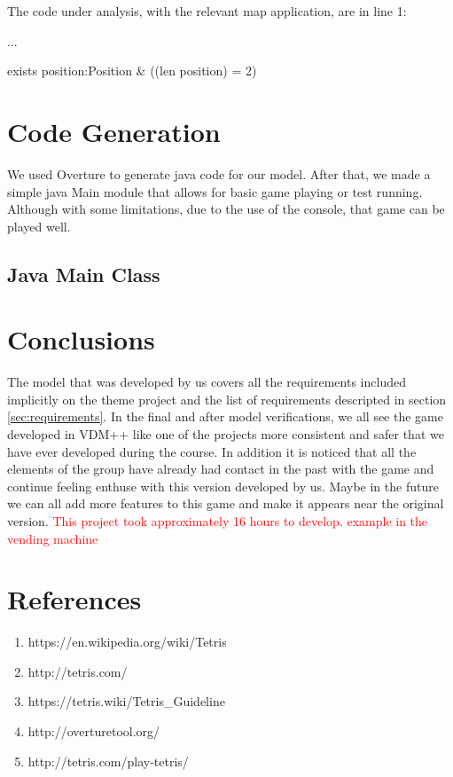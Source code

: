 \documentclass[a4paper]{article}
\begin{document}
The code under analysis, with the relevant map application, are in line 1:



...

\begin{center}
	exists position:Position \& ((len position) = 2)
\end{center}

\section{Code Generation}

We used Overture to generate java code for our model. After that, we made a simple java Main module that allows for basic game playing or test running. Although with some limitations, due to the use of the console, that game can be played well.

\subsection{Java Main Class}


\section{Conclusions} 

The model that was developed by us covers all the requirements included implicitly on the theme project and the list of requirements descripted in section \ref{sec:requirements}.
In the final and after model verifications, we all see the game developed in VDM++ like one of the projects more consistent and safer that we have ever developed during the course. 
In addition it is noticed that all the elements of the group have already had contact in the past with the game and continue feeling enthuse with this version developed by us. Maybe in the future we can all add more features to this game and make it appears near the original version.
\textcolor{red}{This project took approximately 16 hours to develop. example in the vending machine}


\section{References}

\begin{enumerate}
	
\item https://en.wikipedia.org/wiki/Tetris
\item http://tetris.com/
\item https://tetris.wiki/Tetris\_Guideline
\item http://overturetool.org/
\item http://tetris.com/play-tetris/

\end{enumerate}
\end{document}
